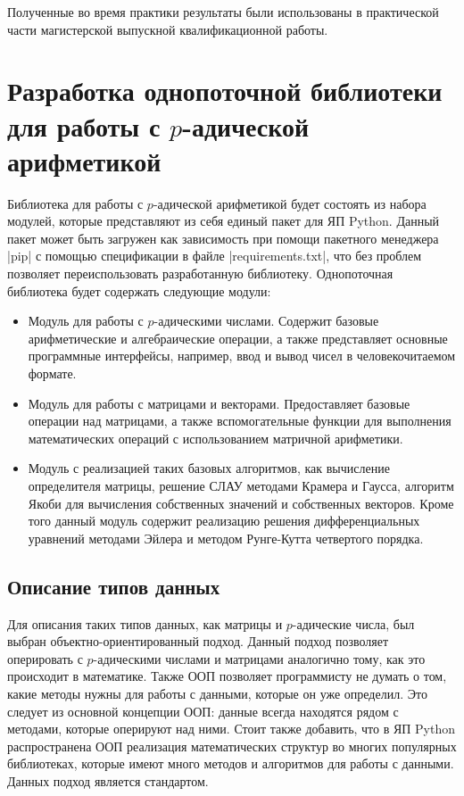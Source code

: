 \documentclass[master, och, times, pract]{sty/SCWorks}
\theoremstyle{plain}
\theoremstyle{definition}
\numberwithin{equation}{section}
\begin{document}
Полученные во время практики результаты были использованы в практической части магистерской выпускной квалификационной работы. 


\section{Разработка однопоточной библиотеки для работы с $p$-адической арифметикой}

Библиотека для работы с $p$-адической арифметикой будет состоять из набора модулей, которые представляют из себя единый пакет для ЯП Python. Данный пакет может быть загружен как зависимость при помощи пакетного менеджера |pip| с помощью спецификации в файле |requirements.txt|, что без проблем позволяет переиспользовать разработанную библиотеку. Однопоточная библиотека будет содержать следующие модули:

\begin{itemize}
\item Модуль для работы с $p$-адическими числами. Содержит базовые арифметические и алгебраические операции, а также представляет основные программные интерфейсы, например, ввод и вывод чисел в человекочитаемом формате.
\item Модуль для работы с матрицами и векторами. Предоставляет базовые операции над матрицами, а также вспомогательные функции для выполнения математических операций с использованием матричной арифметики.
\item Модуль с реализацией таких базовых алгоритмов, как вычисление определителя матрицы, решение СЛАУ методами Крамера и Гаусса, алгоритм Якоби для вычисления собственных значений и собственных векторов. Кроме того данный модуль содержит реализацию решения дифференциальных уравнений методами Эйлера и методом Рунге-Кутта четвертого порядка.
\end{itemize}

\subsection{Описание типов данных}

Для описания таких типов данных, как матрицы и $p$-адические числа, был выбран объектно-ориентированный подход. Данный подход позволяет оперировать с $p$-адическими числами и матрицами аналогично тому, как это происходит в математике. Также ООП позволяет программисту не думать о том, какие методы нужны для работы с данными, которые он уже определил. Это следует из основной концепции ООП: данные всегда находятся рядом с методами, которые оперируют над ними. Стоит также добавить, что в ЯП Python распространена ООП реализация математических структур во многих популярных библиотеках, которые имеют много методов и алгоритмов для работы с данными. Данных подход является стандартом.
\end{document}
